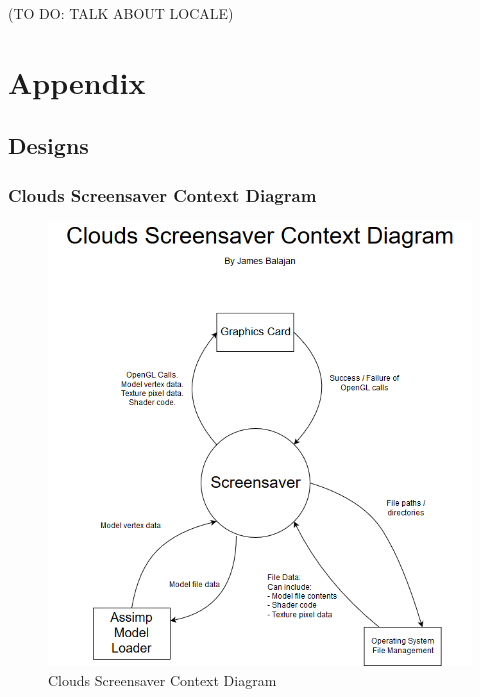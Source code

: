 \documentclass[10pt, openany]{book}
\begin{document}
(TO DO: TALK ABOUT LOCALE)


\printbibliography[heading=bibintoc,title={Bibliography}]

\printglossaries

\chapter{Appendix}
\section{Designs}
\subsection{Clouds Screensaver Context Diagram}
\begin{figure}[H]
	\centering
	\includegraphics[width=0.9\linewidth]{Clouds Context Diagram}
	\caption{Clouds Screensaver Context Diagram}
	\label{app:clouds-context}
\end{figure}
\newpage
\end{document}
